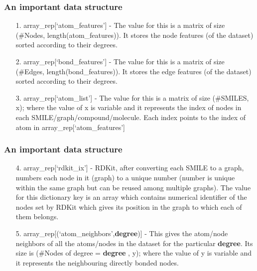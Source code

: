 \documentclass{beamer}
\begin{document}
\begin{frame}
\frametitle{An important data structure}
\begin{enumerate}

	\item[1.] array\_rep[`atom\_features'] - The value for this is a matrix of size (\#Nodes, length(atom\_features)). It stores the node features (of the dataset) sorted according to their degrees.
	
	\item[2.] array\_rep[`bond\_features'] - The value for this is a matrix of size (\#Edges, length(bond\_features)). It stores the edge features (of the dataset) sorted according to their degrees.
	
	\item[3.] array\_rep[`atom\_list'] - The value for this is a matrix of size (\#SMILES, x); where the value of x is variable and it  represents the index of nodes in each SMILE/graph/compound/molecule. Each index points to the index of atom in array\_rep[`atom\_features']



\end{enumerate}
\end{frame}

\begin{frame}
\frametitle{An important data structure}

\begin{enumerate}
	\item[4.] array\_rep[`rdkit\_ix'] - RDKit, after converting each SMILE to a graph, numbers each node in it (graph) to a unique number (number is unique within the same graph but can be reused among multiple graphs). The value for this dictionary key is an array which contains numerical identifier of the nodes set by RDKit which gives its position in the graph to which each of them belongs.
		
	\item[5.] array\_rep[(`atom\_neighbors',\textbf{degree})] - This gives the atom/node neighbors of all the atoms/nodes in the dataset for the  particular \textbf{degree}. Its size is (\#Nodes of degree = \textbf{degree} , y); where the value of y is variable and it represents the neighbouring directly bonded nodes.
		
	

\end{enumerate}
	
\end{frame}
\end{document}
